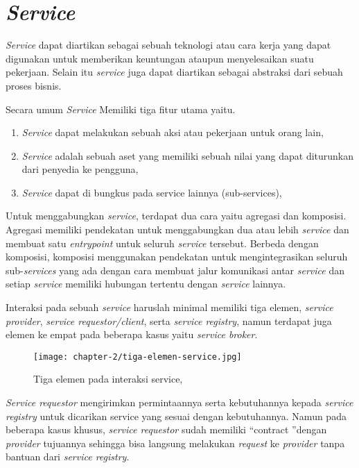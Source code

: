 \section{\textit{Service}}

\textit{Service} dapat diartikan sebagai sebuah teknologi atau cara kerja yang dapat digunakan untuk memberikan keuntungan ataupun menyelesaikan suatu pekerjaan. Selain itu \textit{service} juga dapat diartikan sebagai abstraksi dari sebuah proses bisnis. \parencite{osullivan2002}

Secara umum \textit{Service} Memiliki tiga fitur utama yaitu.
\begin{enumerate}
  \item \textit{Service} dapat melakukan sebuah aksi atau pekerjaan untuk orang lain,
  \item \textit{Service} adalah sebuah aset yang memiliki sebuah nilai yang dapat diturunkan dari penyedia ke pengguna,
  \item \textit{Service} dapat di bungkus pada service lainnya (sub-services),
\end{enumerate}

Untuk menggabungkan \textit{service}, terdapat dua cara yaitu agregasi dan komposisi. Agregasi memiliki pendekatan untuk menggabungkan dua atau lebih \textit{service} dan membuat satu \textit{entrypoint} untuk seluruh \textit{service} tersebut. Berbeda dengan komposisi, komposisi menggunakan pendekatan untuk mengintegrasikan seluruh sub-\textit{services} yang ada dengan cara membuat jalur komunikasi antar \textit{service} dan setiap \textit{service} memiliki hubungan tertentu dengan \textit{service} lainnya.

Interaksi pada sebuah \textit{service} haruslah minimal memiliki tiga elemen, \textit{service provider}, \textit{service requestor/client}, serta \textit{\textit{service registry}}, namun terdapat juga elemen ke empat pada beberapa kasus yaitu \textit{service broker}.

\begin{figure}[h]
  \centering
  \texttt{[image: chapter-2/tiga-elemen-service.jpg]}
  \caption{Tiga elemen pada interaksi service, \parencite{abugessaisa2023}}
  \label{fig:tiga-elemen-service}
\end{figure}

\textit{Service requestor} mengirimkan permintaannya serta kebutuhannya kepada \textit{service registry} untuk dicarikan service yang sesuai dengan kebutuhannya. Namun pada beberapa kasus khusus, \textit{service requestor}
sudah memiliki \textquotedblleft contract \textquotedblright dengan \textit{provider} tujuannya sehingga bisa langsung melakukan \textit{request} ke \textit{provider} tanpa bantuan dari \textit{service registry}.

